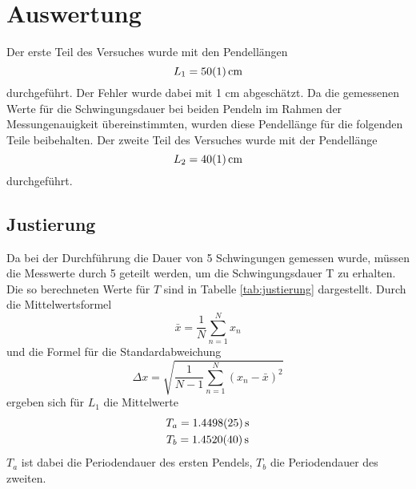 \section{Auswertung}
\label{sec:Auswertung}

Der erste Teil des Versuches wurde mit den Pendellängen
\begin{equation*}
    L_1 = \SI{50 +- 1}{cm} 
\end{equation*}
durchgeführt. Der Fehler wurde dabei mit 1 cm abgeschätzt. Da die gemessenen Werte für die Schwingungsdauer bei beiden Pendeln im Rahmen der Messungenauigkeit übereinstimmten,
wurden diese Pendellänge für die folgenden Teile beibehalten.
Der zweite Teil des Versuches wurde mit der Pendellänge
\begin{equation}
    L_2 = \SI{40 +- 1}{cm}
\end{equation}
durchgeführt.

\subsection{Justierung}


Da bei der Durchführung die Dauer von 5 Schwingungen gemessen wurde, müssen die Messwerte durch 5 geteilt werden, um die Schwingungsdauer T zu erhalten.
Die so berechneten Werte für $T$ sind in Tabelle \ref{tab:justierung} dargestellt.
Durch die Mittelwertsformel 
\begin{equation}
    \label{eq:mittelwert}
    \bar{x} = \frac{1}{N} \sum_{n=1}^N x_n
\end{equation}
und die Formel für die Standardabweichung
\begin{equation}
    \label{eq:abweichung}
    \Delta x = \sqrt{\frac{1}{N-1} \sum_{n=1}^N (x_n-\bar{x})^2 }
\end{equation}
ergeben sich für $L_1$ die Mittelwerte
\begin{gather*}
    T_a = \SI{1.4498 +- 0.0025}{s} \\
    T_b = \SI{1.4520 +- 0.0040}{s}
\end{gather*}
$T_a$ ist dabei die Periodendauer des ersten Pendels, $T_b$ die Periodendauer des zweiten.

